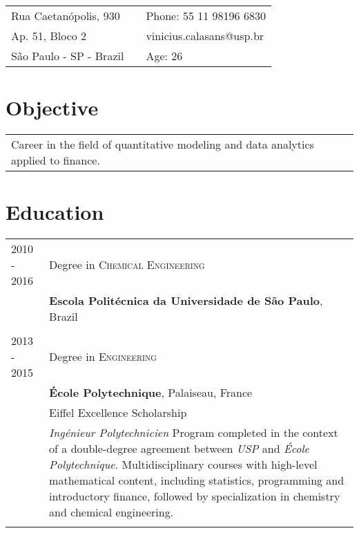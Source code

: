 \documentclass[a4paper,10pt]{article}
\begin{document}
{\centering \begin{tabular}{R{5cm} p{0.1cm} L{5.6cm}}
		Rua Caetanópolis, 930 & & Phone: 55 11 98196 6830\\
		Ap. 51, Bloco 2 & & {vinicius.calasans@usp.br}\\
		São Paulo - SP - Brazil & & Age: 26\\
	\end{tabular}

\section{Objective}

\vspace*{3pt}
\hspace*{-20pt}
\begin{tabular}{ll}

  Career in the field of quantitative modeling and data analytics applied to finance.   & {}\\
\end{tabular}
\vspace*{5pt}


\section{Education}

\vspace*{3pt}
\hspace*{-12pt}
\begin{tabular}{R{3.5cm} p{10cm}}


\textsc{2010 - 2016} \emph{} & Degree in \textsc{}\textsc{Chemical Engineering} \\&\textbf{Escola Politécnica da
Universidade de São Paulo}, Brazil\\
&\\

\textsc{2013 - 2015} & Degree in \textsc{Engineering} \\& \textbf{École Polytechnique}, Palaiseau, France\\
& Eiffel Excellence Scholarship \\&\footnotesize\emph{Ingénieur Polytechnicien }\footnotesize{Program completed in the
context of a double-degree agreement between \emph{USP} and \emph{École Polytechnique}. Multidisciplinary courses with
high-level mathematical content, including statistics, programming and introductory finance, followed by specialization
in chemistry and chemical engineering.} \\
&\\



\end{tabular}}
\end{document}
